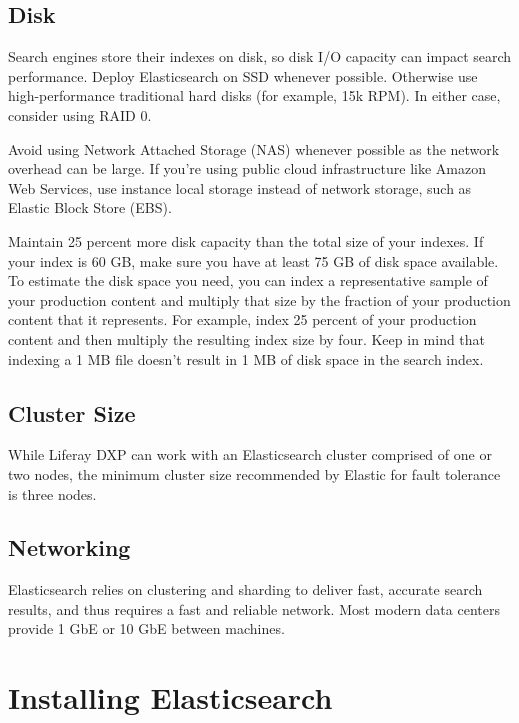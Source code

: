 \section{Disk}\label{disk}

Search engines store their indexes on disk, so disk I/O capacity can
impact search performance. Deploy Elasticsearch on SSD whenever
possible. Otherwise use high-performance traditional hard disks (for
example, 15k RPM). In either case, consider using RAID 0.

Avoid using Network Attached Storage (NAS) whenever possible as the
network overhead can be large. If you're using public cloud
infrastructure like Amazon Web Services, use instance local storage
instead of network storage, such as Elastic Block Store (EBS).

Maintain 25 percent more disk capacity than the total size of your
indexes. If your index is 60 GB, make sure you have at least 75 GB of
disk space available. To estimate the disk space you need, you can index
a representative sample of your production content and multiply that
size by the fraction of your production content that it represents. For
example, index 25 percent of your production content and then multiply
the resulting index size by four. Keep in mind that indexing a 1 MB file
doesn't result in 1 MB of disk space in the search index.

\section{Cluster Size}\label{cluster-size}

While Liferay DXP can work with an Elasticsearch cluster comprised of
one or two nodes, the minimum cluster size recommended by Elastic for
fault tolerance is three nodes.

\section{Networking}\label{networking}

Elasticsearch relies on clustering and sharding to deliver fast,
accurate search results, and thus requires a fast and reliable network.
Most modern data centers provide 1 GbE or 10 GbE between machines.

\chapter{Installing Elasticsearch}\label{installing-elasticsearch}


